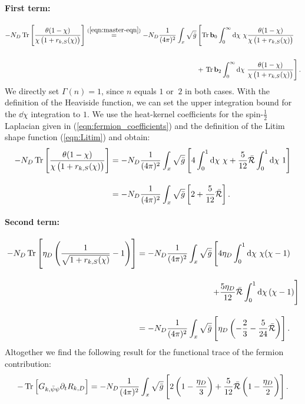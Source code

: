 \paragraph{First term:} 
\begin{align}
		-N_D\tr{\frac{\theta(1-\chi)}{\chi\left(1+r_{k,S}(\chi)\right)}} \overset{(\mathrm{\ref{eqn:master-eqn}})}{=} -N_D\frac{1}{(4\pi)^2}\int_x\sqrt{\bar{g}}&\left[\operatorname{Tr}\mathbf{b}_0\int_0^{\infty}\dd\chi\ \chi\frac{\theta(1-\chi)}{\chi\left(1+r_{k,S}(\chi)\right)}\right.\nonumber \\
		\phantom{.}\\
 &+ \left.\operatorname{Tr}\mathbf{b}_2\int_0^{\infty}\dd\chi\ \frac{\theta(1-\chi)}{\chi\left(1+r_{k,S}(\chi)\right)}\right].\nonumber
\end{align}
We directly set $\Gamma(n)=1$, since $n$ equals $1$ or $\ 2$ in both cases. With the definition of the Heaviside function, we can set the upper integration bound for the $\dd\chi$ integration to $1$. We use the heat-kernel coefficients for the spin-$\frac{1}{2}$ Laplacian given in (\ref{eqn:fermion_coefficients}) and the definition of the Litim shape function (\ref{eqn:Litim}) and obtain:
\begin{equation}
\begin{aligned}
		-N_D\operatorname{Tr}\left[ \frac{\theta(1-\chi)}{\chi\left(1+r_{k,S}(\chi)\right)} \right] &= -N_D\frac{1}{(4\pi)^2}\int_x\sqrt{\bar{g}}\left[4\int_0^1\dd\chi \ \chi + \frac{5}{12}\bar{\mathcal{R}}\int_0^1\dd\chi\  1\right]\\[10pt]
&= -N_D\frac{1}{(4\pi)^2}\int_x\sqrt{\bar{g}}\left[2 + \frac{5}{12}\bar{\mathcal{R}}\right].
\end{aligned}
\end{equation}
\paragraph{Second term:}
\begin{equation}
\begin{aligned}
	-N_D\operatorname{Tr}\left[ \eta_D\left(\frac{1}{\sqrt{1+r_{k,S}(\chi)}}-1\right) \right] &= -N_D\frac{1}{(4\pi)^2} \int_x\sqrt{\bar{g}}\left[4\eta_D\int_0^1\dd\chi \ \chi(\chi-1)\right. \\[10pt]
 &\left. \qquad\qquad\qquad\qquad\quad+ \frac{5\eta_D}{12}\bar{\mathcal{R}}\int_0^1\dd\chi\left(\chi-1\right)\right]\\[10pt]
	&= -N_D\frac{1}{(4\pi)^2} \int_x\sqrt{\bar{g}} \left[\eta_D\left(-\frac{2}{3} - \frac{5}{24}\bar{\mathcal{R}}\right)\right].
\end{aligned}
\end{equation}
Altogether we find the following result for the functional trace of the fermion contribution:
\begin{equation}
	-\operatorname{Tr}\left[G_{k, \bar{\psi} \psi} \partial_{t} R_{k, D}\right]= -N_D\frac{1}{(4\pi)^2}\int_x\sqrt{\bar{g}}\left[2\left(1-\frac{\eta_D}{3}\right) + \frac{5}{12}\bar{\mathcal{R}}\left(1-\frac{\eta_D}{2}\right)\right].
	\label{eqn:trace_fermions}
\end{equation}
\vfill
